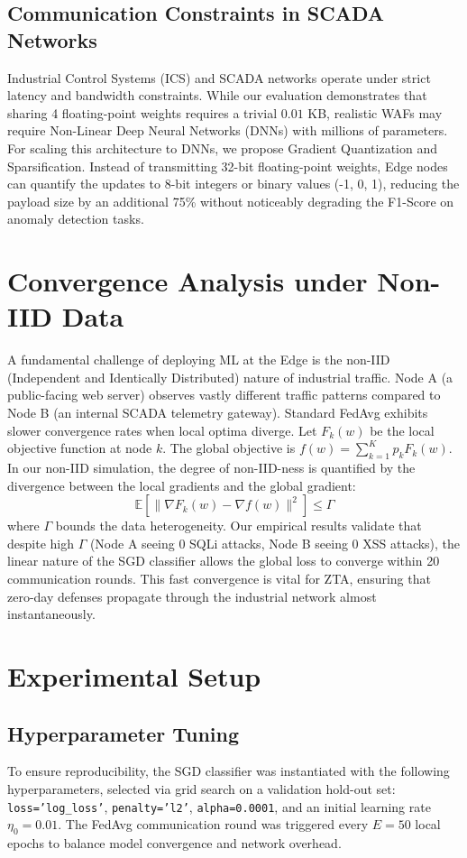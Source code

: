 \documentclass[conference]{IEEEtran}
\begin{document}
\subsection{Communication Constraints in SCADA Networks}
Industrial Control Systems (ICS) and SCADA networks operate under strict latency and bandwidth constraints. While our evaluation demonstrates that sharing 4 floating-point weights requires a trivial $0.01$ KB, realistic WAFs may require Non-Linear Deep Neural Networks (DNNs) with millions of parameters.
For scaling this architecture to DNNs, we propose Gradient Quantization and Sparsification. Instead of transmitting 32-bit floating-point weights, Edge nodes can quantify the updates to 8-bit integers or binary values (-1, 0, 1), reducing the payload size by an additional 75\% without noticeably degrading the F1-Score on anomaly detection tasks.

\section{Convergence Analysis under Non-IID Data}
A fundamental challenge of deploying ML at the Edge is the non-IID (Independent and Identically Distributed) nature of industrial traffic. Node A (a public-facing web server) observes vastly different traffic patterns compared to Node B (an internal SCADA telemetry gateway).
Standard FedAvg exhibits slower convergence rates when local optima diverge. Let $F_k(w)$ be the local objective function at node $k$. The global objective is $f(w) = \sum_{k=1}^K p_k F_k(w)$. In our non-IID simulation, the degree of non-IID-ness is quantified by the divergence between the local gradients and the global gradient:
\begin{equation}
    \mathbb{E} [ \| \nabla F_k(w) - \nabla f(w) \|^2 ] \leq \Gamma
\end{equation}
where $\Gamma$ bounds the data heterogeneity. Our empirical results validate that despite high $\Gamma$ (Node A seeing 0 SQLi attacks, Node B seeing 0 XSS attacks), the linear nature of the SGD classifier allows the global loss to converge within 20 communication rounds. This fast convergence is vital for ZTA, ensuring that zero-day defenses propagate through the industrial network almost instantaneously.


\section{Experimental Setup}

\subsection{Hyperparameter Tuning}
To ensure reproducibility, the SGD classifier was instantiated with the following hyperparameters, selected via grid search on a validation hold-out set: \texttt{loss='log\_loss'}, \texttt{penalty='l2'}, \texttt{alpha=0.0001}, and an initial learning rate $\eta_0 = 0.01$. The FedAvg communication round was triggered every $E=50$ local epochs to balance model convergence and network overhead.
\end{document}
